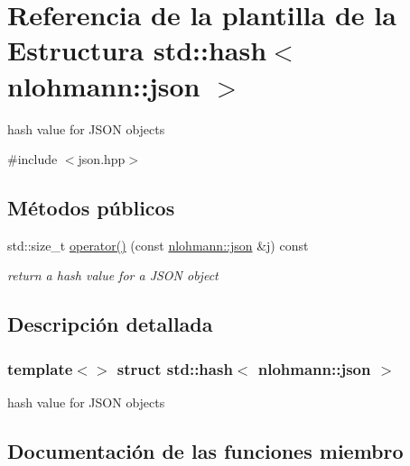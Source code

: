 \hypertarget{structstd_1_1hash_3_01nlohmann_1_1json_01_4}{}\section{Referencia de la plantilla de la Estructura std\+:\+:hash$<$ nlohmann\+:\+:json $>$}
\label{structstd_1_1hash_3_01nlohmann_1_1json_01_4}


hash value for J\+S\+ON objects  




{\ttfamily \#include $<$json.\+hpp$>$}

\subsection*{Métodos públicos}
\begin{DoxyCompactItemize}
\item 
std\+::size\+\_\+t \mbox{\hyperlink{structstd_1_1hash_3_01nlohmann_1_1json_01_4_aec1567d1fa47dbe5b77954dce3a55b64}{operator()}} (const \mbox{\hyperlink{namespacenlohmann_a2bfd99e845a2e5cd90aeaf1b1431f474}{nlohmann\+::json}} \&j) const
\begin{DoxyCompactList}\small\item\em return a hash value for a J\+S\+ON object \end{DoxyCompactList}\end{DoxyCompactItemize}


\subsection{Descripción detallada}
\subsubsection*{template$<$$>$\newline
struct std\+::hash$<$ nlohmann\+::json $>$}

hash value for J\+S\+ON objects 

\subsection{Documentación de las funciones miembro}
\mbox{\label{structstd_1_1hash_3_01nlohmann_1_1json_01_4_aec1567d1fa47dbe5b77954dce3a55b64}} 
